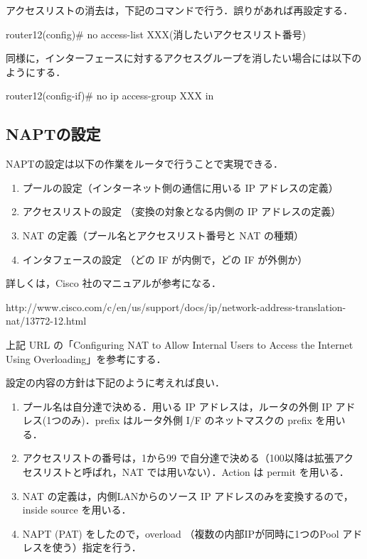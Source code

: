 アクセスリストの消去は，下記のコマンドで行う．誤りがあれば再設定する．
\begin{cli}
router12(config)# no access-list XXX(消したいアクセスリスト番号)
\end{cli}

同様に，インターフェースに対するアクセスグループを消したい場合には以下のようにする．
\begin{cli}
router12(config-if)# no ip access-group XXX in
\end{cli}

\clearpage

\subsection{NAPTの設定}

NAPTの設定は以下の作業をルータで行うことで実現できる．

\begin{enumerate}
 \item プールの設定（インターネット側の通信に用いる IP アドレスの定義）
 \item アクセスリストの設定 （変換の対象となる内側の IP アドレスの定義）
 \item NAT の定義（プール名とアクセスリスト番号と NAT の種類）
 \item インタフェースの設定 （どの IF が内側で，どの IF が外側か）
\end{enumerate}

詳しくは，Cisco 社のマニュアルが参考になる．

http://www.cisco.com/c/en/us/support/docs/ip/network-address-translation-nat/13772-12.html

上記 URL の「Configuring NAT to Allow Internal Users to Access the Internet Using Overloading」を参考にする．

設定の内容の方針は下記のように考えれば良い．
\begin{enumerate}
 \item プール名は自分達で決める．用いる IP アドレスは，ルータの外側 IP
       アドレス(1つのみ)．prefix はルータ外側 I/F のネットマスクの
       prefix を用いる．
 \item アクセスリストの番号は，1から99 で自分達で決める（100以降は拡張アク
       セスリストと呼ばれ，NAT では用いない）．Action は permit を用いる．
 \item NAT の定義は，内側LANからのソース IP アドレスのみを変換するので，inside source を用いる．
 \item NAPT (PAT) をしたので，overload （複数の内部IPが同時に1つのPool アドレスを使う）指定を行う．
\end{enumerate}

